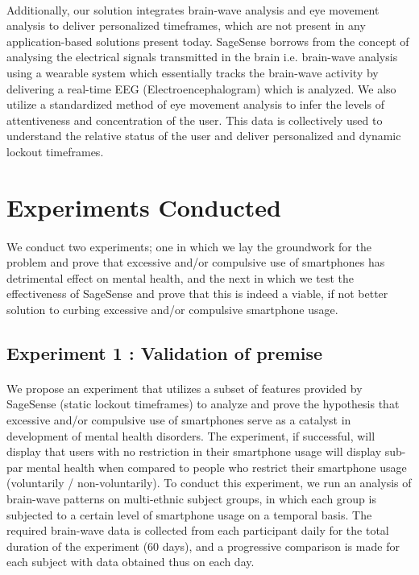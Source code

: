 \documentclass{article}
\begin{document}
\paragraph{} Additionally, our solution integrates brain-wave analysis and eye movement analysis to deliver personalized timeframes, which are not present in any application-based solutions present today. SageSense borrows from the concept of analysing the electrical signals transmitted in the brain i.e. brain-wave analysis\cite{da1991neural, buzsaki2006rhythms} using a wearable system which essentially tracks the brain-wave activity by delivering a real-time EEG (Electroencephalogram) which is analyzed\cite{sigl1994introduction}. We also utilize a standardized method of eye movement analysis\cite{ulmer1996process} to infer the levels of attentiveness and concentration of the user. This data is collectively used to understand the relative status of the user and deliver personalized and dynamic lockout timeframes.

\section{Experiments Conducted}

\paragraph{} We conduct two experiments; one in which we lay the groundwork for the problem and prove that excessive and/or compulsive use of smartphones has detrimental effect on mental health, and the next in which we test the effectiveness of SageSense and prove that this is indeed a viable, if not better solution to curbing excessive and/or compulsive smartphone usage.

\subsection{Experiment 1 : Validation of premise}

\paragraph{} We propose an experiment that utilizes a subset of features provided by SageSense (static lockout timeframes) to analyze and prove the hypothesis that excessive and/or compulsive use of smartphones serve as a catalyst in development of mental health disorders. The experiment, if successful, will display that users with no restriction in their smartphone usage will display sub-par mental health when compared to people who restrict their smartphone usage (voluntarily / non-voluntarily). To conduct this experiment, we run an analysis of brain-wave patterns on multi-ethnic subject groups, in which each group is subjected to a certain level of smartphone usage on a temporal basis. The required brain-wave data is collected from each participant daily for the total duration of the experiment (60 days), and a progressive comparison is made for each subject with data obtained thus on each day.
\end{document}
